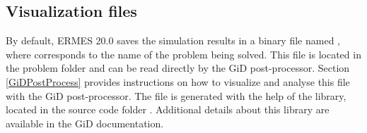 \subsection{Visualization files}\label{ssVisualizationFiles}

By default, ERMES 20.0 saves the simulation results in a binary file named , where  corresponds to the name of the problem being solved. This file is located in the problem folder and can be read directly by the GiD post-processor. Section \ref{GiDPostProcess} provides instructions on how to visualize and analyse this file with the GiD post-processor. The file is generated with the help of the  library, located in the source code folder . Additional details about this library are available in the GiD documentation.

